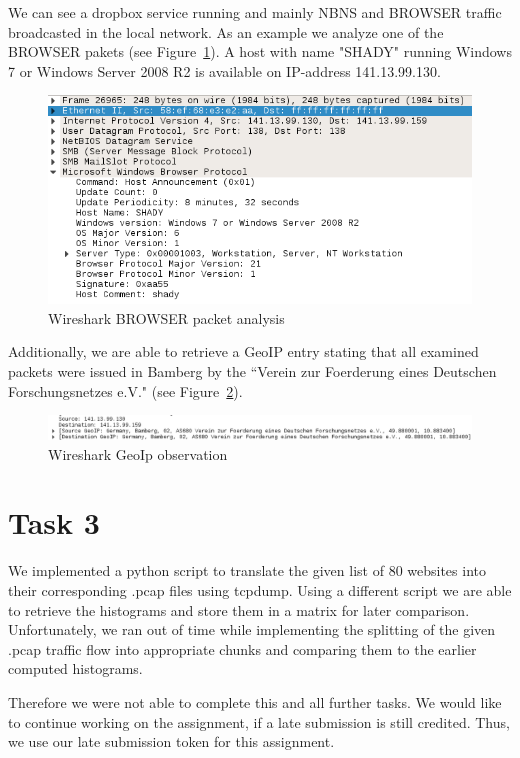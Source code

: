 \documentclass[12pt]{article}
\begin{document}
We can see a dropbox service running and mainly NBNS and BROWSER traffic broadcasted in the local network. As an example we analyze one of the BROWSER pakets (see Figure~\ref{img_wireshark_browser}).
A host with name "SHADY" running Windows 7 or Windows Server 2008 R2 is available on IP-address 141.13.99.130.

\begin{figure}[h]%
\centering%
\includegraphics[width=\textwidth]{images/wireshark_browser.png}%
\caption{Wireshark BROWSER packet analysis}%
\label{img_wireshark_browser}%
\end{figure}%

Additionally, we are able to retrieve a GeoIP entry stating that all examined packets were issued in Bamberg by the ``Verein zur Foerderung eines Deutschen Forschungsnetzes e.V." (see Figure~\ref{img_wireshark_geoip}).

\begin{figure}[h]%
\centering%
\includegraphics[width=\textwidth]{images/wireshark_geoip.png}%
\caption{Wireshark GeoIp observation}%
\label{img_wireshark_geoip}%
\end{figure}%

\newpage
\section{Task 3}\label{task3}
We implemented a python script to translate the given list of 80 websites into their corresponding .pcap files using tcpdump. Using a different script we are able to retrieve the histograms and store them in a matrix for later comparison.
Unfortunately, we ran out of time while implementing the splitting of the given .pcap traffic flow into appropriate chunks and comparing them to the earlier computed histograms.

Therefore we were not able to complete this and all further tasks. We would like to continue working on the assignment, if a late submission is still credited. Thus, we use our late submission token for this assignment.  
\end{document}
